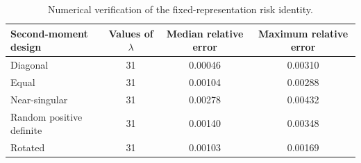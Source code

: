 \begin{table}[H]
\centering
\small
\begin{tabular}{lccc}
\toprule
Second-moment design & Values of \(\lambda\) & Median relative error & Maximum relative error \\
\midrule
Diagonal & 31 & 0.00046 & 0.00310 \\
Equal & 31 & 0.00104 & 0.00288 \\
Near-singular & 31 & 0.00278 & 0.00432 \\
Random positive definite & 31 & 0.00140 & 0.00348 \\
Rotated & 31 & 0.00103 & 0.00169 \\
\bottomrule
\end{tabular}
\caption{Numerical verification of the fixed-representation risk identity.}
\label{tab:theory-verification}
\end{table}
